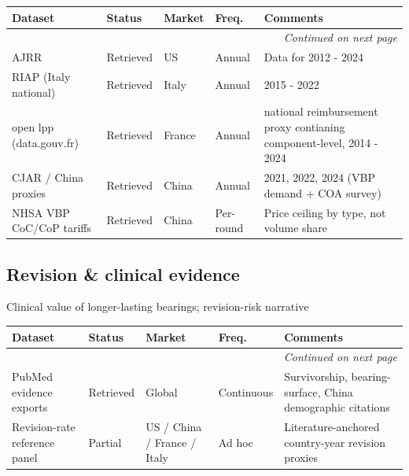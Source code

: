 \documentclass{article}
\begin{document}
\small
\setlength{\tabcolsep}{4pt}
\renewcommand{\arraystretch}{1.15}
\begin{longtable}{@{}p{3.0cm}p{2.0cm}p{2.1cm}p{1.9cm}p{5.8cm}@{}}
\toprule
\textbf{Dataset} & \textbf{Status} & \textbf{Market} & \textbf{Freq.} & \textbf{Comments} \\
\midrule
\endhead
\midrule
\multicolumn{5}{r}{\textit{Continued on next page}} \\
\endfoot
\bottomrule
\endlastfoot
AJRR & \textcolor{green!60!black}{Retrieved} & US & Annual & Data for 2012 - 2024 \\
RIAP (Italy national) & \textcolor{green!60!black}{Retrieved} & Italy & Annual & 2015 - 2022 \\
open lpp (data.gouv.fr) & \textcolor{green!60!black}{Retrieved} & France & Annual & national reimbursement proxy contianing component-level, 2014 - 2024 \\
CJAR / China proxies & \textcolor{green!60!black}{Retrieved} & China & Annual & 2021, 2022, 2024 (VBP demand + COA survey) \\
NHSA VBP CoC/CoP tariffs & \textcolor{green!60!black}{Retrieved} & China & Per-round & Price ceiling by type, not volume share \\
\end{longtable}
\normalsize

\subsection{Revision \& clinical evidence}
Clinical value of longer-lasting bearings; revision-risk narrative\\[0.5em]

\small
\setlength{\tabcolsep}{4pt}
\renewcommand{\arraystretch}{1.15}
\begin{longtable}{@{}p{3.0cm}p{2.0cm}p{2.1cm}p{1.9cm}p{5.8cm}@{}}
\toprule
\textbf{Dataset} & \textbf{Status} & \textbf{Market} & \textbf{Freq.} & \textbf{Comments} \\
\midrule
\endhead
\midrule
\multicolumn{5}{r}{\textit{Continued on next page}} \\
\endfoot
\bottomrule
\endlastfoot
PubMed evidence exports & \textcolor{green!60!black}{Retrieved} & Global & Continuous & Survivorship, bearing-surface, China demographic citations \\
Revision-rate reference panel & \textcolor{orange!85!black}{Partial} & US / China / France / Italy & Ad hoc & Literature-anchored country-year revision proxies \\
\end{longtable}
\normalsize
\end{document}
